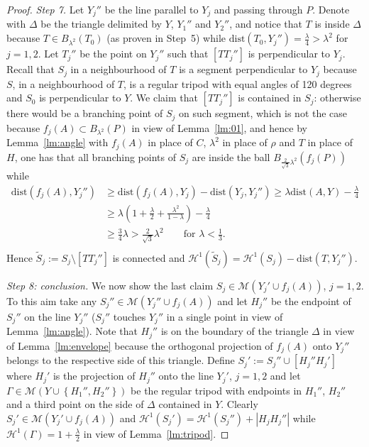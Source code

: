 \documentclass{amsart}
\renewcommand{\H}{\mathcal H}
\newcommand{\abs}[1]{\left\vert #1 \right\vert}
\newcommand{\enclose}[1]{\left(#1\right)}
\newcommand{\ENCLOSE}[1]{\left\{#1\right\}}
\newcommand{\M}{\mathcal{M}}
\renewcommand{\H}{\mathcal{H}}
\newcommand{\dist}{\mathrm{dist}}
\theoremstyle{definition}
\theoremstyle{remark}
\begin{document}
\begin{proof}
  \emph{Step 7.}
  Let $Y_j''$ be the line parallel to $Y_j$ and passing through $P$.
  Denote with $\Delta$ be the triangle delimited by $Y$, $Y_1''$ and $Y_2''$,
  and notice that $T$ is inside $\Delta$ because $T\in B_{\lambda^2}(T_0)$
  (as proven in Step~5)
  while $\dist(T_0, Y_j'') = \frac{\lambda}{4}>\lambda^2$ for $j=1,2$.
  Let $T_j''$ be the point on $Y_j''$ such that $[T T_j'']$ is perpendicular
  to $Y_j$. 
  Recall that $S_j$ in a neighbourhood of $T$ is a segment perpendicular 
  to $Y_j$ because $S$, in a neighbourhood of $T$, 
  is a regular tripod with equal angles of 120 degrees 
  and $S_0$ is perpendicular to $Y$.
  We claim that $[T T_j'']$ is contained in $S_j$: otherwise there would 
  be a branching point of $S_j$ on such segment, which is not the case because
  $f_j(A)\subset B_{\lambda^2}(P)$ in view of Lemma~\ref{lm:01},
  and hence by Lemma~\ref{lm:angle} with $f_j(A)$ in place of $C$, $\lambda^2$ in place 
  of $\rho$ and $T$ in place of $H$, one has that   
  all branching points of $S_j$ are inside 
  the ball $B_{\frac{2}{\sqrt 3}\lambda^2}(f_j(P))$ while
  \begin{align*}
    \dist(f_j(A), Y_j'') 
    &\ge \dist(f_j(A), Y_j) - \dist(Y_j, Y_j'')
    \ge \lambda \dist(A,Y) - \frac{\lambda}{4}  \\
    & \ge \lambda \enclose{1 + \frac \lambda 2 + \frac{\lambda^2}{1-\lambda}} - \frac \lambda 4 \\ 
    & \ge \frac 3 4 \lambda
    > \frac 2 {\sqrt 3}\lambda^2
    \qquad \text{for $\lambda < \frac 1 3$}. \\
  \end{align*}
  Hence $\tilde S_j:= S_j\setminus [T T_j'']$ is connected and 
  $\H^1(\tilde S_j)=\H^1(S_j) - \dist(T,Y_j'')$.

  \emph{Step 8: conclusion.}
  We now show the last claim $S_j \in \M(Y_j'\cup f_j(A))$, $j=1,2$.
  To this aim take any $S_j''\in \M(Y_j''\cup f_j (A))$ and let $H_j''$ be the 
  endpoint of $S_j''$ on the line $Y_j''$ ($S_j''$ touches $Y_j''$ in a single point 
  in view of Lemma~\ref{lm:angle}). 
  Note that $H_j''$ is on the boundary of the triangle $\Delta$ 
  in view of Lemma~\ref{lm:envelope} 
  because the orthogonal 
  projection of $f_j(A)$ onto $Y_j''$ belongs to the respective side of this triangle.
  Define $S_j':= S_j''\cup [H_j'' H_j']$ where $H_j'$ is the projection of $H_j''$ 
  onto the line $Y_j'$, $j=1,2$ and let $\Gamma\in \M(Y\cup \ENCLOSE{H_1'',H_2''})$
  be the regular tripod with endpoints in $H_1''$, $H_2''$ and a third point on 
  the side of $\Delta$ contained in $Y$.
  Clearly $S_j'\in \M(Y_j'\cup f_j(A))$ and $\H^1(S_j')=\H^1(S_j'') + \abs{H_j H_j''}$
  while $\H^1(\Gamma) = 1+\frac \lambda 2$ in view of Lemma~\ref{lm:tripod}.


\end{proof}
\end{document}
